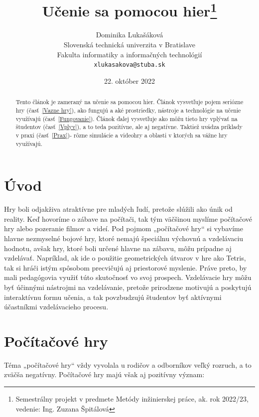 \documentclass[10pt,twoside,slovak,a4paper]{article}
\title{Učenie sa pomocou hier\thanks{Semestrálny projekt v predmete Metódy inžinierskej práce, ak. rok 2022/23, vedenie: Ing. Zuzana Špitálová}}
\author{Dominika Lukašáková\\[2pt]

	{\small Slovenská technická univerzita v Bratislave}\\
	{\small Fakulta informatiky a informačných technológií}\\
	{\small \texttt{xlukasakova@stuba.sk}}
	}
\date{\small 22. október 2022}
\begin{document}
\maketitle

\begin{abstract}
Tento článok je zameraný na učenie sa pomocou hier. Článok vysvetľuje pojem seriózne hry (časť~\ref{Vazne hry}), ako fungujú a aké prostriedky, nástroje a technológie na učenie využívajú (časť~\ref{Fungovanie}). Článok ďalej vysvetľuje ako môžu tieto hry vplývať na študentov (časť~\ref{Vplyv}), a to teda pozitívne, ale aj negatívne. Taktiež uvádza príklady v praxi (časť~\ref{Prax})- rôzne simulácie a videohry a oblasti v ktorých sa vážne hry využívajú. 
\end{abstract}



\section{Úvod}



Hry boli odjakživa atraktívne pre mladých ľudí, pretože slúžili ako únik od reality. Keď hovoríme o zábave na počítači, tak tým väčšinou myslíme počítačové hry alebo pozeranie filmov a videí. Pod pojmom „počítačové hry“ si vybavíme hlavne nezmyselné bojové hry, ktoré nemajú špeciálnu výchovnú a vzdelávaciu hodnotu, avšak hry, ktoré boli určené hlavne na zábavu, môžu prípadne aj vzdelávať. Napríklad, ak ide o použitie geometrických útvarov v hre ako Tetris, tak si hráči istým spôsobom precvičujú aj priestorové myslenie. Práve preto, by mali pedagógovia využiť túto skutočnosť vo svoj prospech. Vzdelávacie hry môžu byť účinnými nástrojmi na vzdelávanie, pretože prirodzene motivujú a poskytujú interaktívnu formu učenia, a tak povzbudzujú študentov byť aktívnymi účastníkmi vzdelávacieho procesu. 

\vspace{5mm} %

\emph{} \cite{Gee}

\newpage

\section{Počítačové hry}



Téma „počítačové hry“ vždy vyvolala u rodičov a odborníkov veľký rozruch, a to zväčša negatívny. Počítačové hry majú však aj pozitívny význam:   
\end{document}
